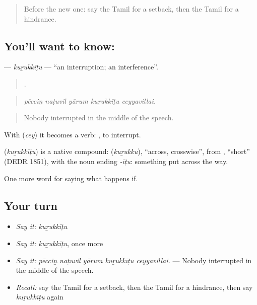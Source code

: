 \label{lesson:TA-C546-kurukkitu}



\begin{quote}
Before the new one: say the Tamil for a setback, then the Tamil for a hindrance.
\end{quote}

\subsection*{You'll want to know: }
\textbf{} — \emph{kuṟukkīṭu} — \textquotedblleft{}an interruption; an interference\textquotedblright{}.

\begin{quote}
    .
\end{quote}

\begin{quote}
\emph{pēcciṉ naṭuvil yārum kuṟukkīṭu ceyyavillai.}
\end{quote}

\begin{quote}
Nobody interrupted in the middle of the speech.
\end{quote}

With  (\emph{cey}) it becomes a verb:  , to interrupt.

\begin{cousinweb}
\textbf{} (\emph{kuṟukkīṭu}) is a native compound:  (\emph{kuṟukku}), \textquotedblleft{}across, crosswise\textquotedblright{}, from , \textquotedblleft{}short\textquotedblright{} (DEDR 1851), with the noun ending \emph{-īṭu}: something put across the way.
\end{cousinweb}

\begin{grammarlens}[title={What you've built}]
One more word for saying what happens if.
\end{grammarlens}

\subsection*{Your turn}
\begin{itemize}
\raggedright
  \item \emph{Say it:} \emph{kuṟukkīṭu}
  \item \emph{Say it:} \emph{kuṟukkīṭu}, once more
  \item \emph{Say it:} \emph{pēcciṉ naṭuvil yārum kuṟukkīṭu ceyyavillai.} — Nobody interrupted in the middle of the speech.
  \item \emph{Recall:} say the Tamil for a setback, then the Tamil for a hindrance, then say \emph{kuṟukkīṭu} again
\end{itemize}

